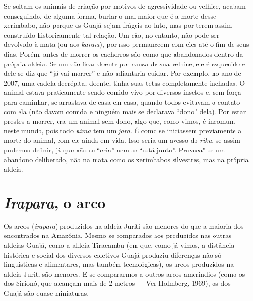 Se soltam os animais de criação por motivos de agressividade ou velhice,
acabam conseguindo, de alguma forma, burlar o mal maior que é a morte
desse xerimbabo, não porque os Guajá sejam frágeis ao luto, mas por
terem assim construído historicamente tal relação. Um cão, no entanto,
não pode ser devolvido à mata (ou aos \emph{karaia}), por isso
permanecem com eles até o fim de seus dias. Porém, antes de morrer os
cachorros são como que abandonados dentro da própria aldeia. Se um cão
ficar doente por causa de sua velhice, ele é esquecido e dele se diz que
``já vai morrer'' e não adiantaria cuidar. Por exemplo, no ano de 2007,
uma cadela decrépita, doente, tinha suas tetas completamente inchadas. O
animal estava praticamente sendo comido vivo por diversos insetos e, sem
força para caminhar, se arrastava de casa em casa, quando todos evitavam
o contato com ela (não davam comida e ninguém mais se declarava ``dono''
dela). Por estar prestes a morrer, era um animal sem dono, algo que,
como vimos, é incomum neste mundo, pois todo \emph{nima} tem um
\emph{jara}. É como se iniciassem previamente a morte do animal, com ele
ainda em vida. Isso seria um avesso do \emph{riku}, se assim podemos
definir, já que não se ``cria'' nem se ``está junto''. Provoca"-se um
abandono deliberado, não na mata como os xerimbabos silvestres, mas na
própria aldeia.

\section{\emph{Irapara}, o arco}

Os arcos (\emph{irapara}) produzidos na aldeia Juriti são menores do que
a maioria dos encontrados na Amazônia. Mesmo se comparados aos
produzidos nas outras aldeias Guajá, como a aldeia Tiracambu (em que,
como já vimos, a distância histórica e social dos diversos coletivos
Guajá produziu diferenças não só linguísticas e alimentares, mas também
tecnológicas), os arcos produzidos na aldeia Juriti são menores. E se
compararmos a outros arcos ameríndios (como os dos Sirionó, que alcançam
mais de 2 metros --- Ver Holmberg, 1969), os dos Guajá são quase
miniaturas.

